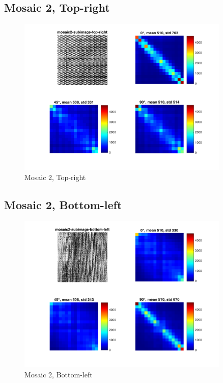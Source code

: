 \documentclass[a4paper,12pt,titlepage]{article}
\begin{document}
\subsection{Mosaic 2, Top-right}
\begin{figure}[H]
\includegraphics[width=0.9\textwidth]{partB-mosaic2-subimage-top-right}
\caption{Mosaic 2, Top-right}
\label{fig:Mosaic2SubimageTopRight}
\end{figure}

\subsection{Mosaic 2, Bottom-left}
\begin{figure}[H]
\includegraphics[width=0.9\textwidth]{partB-mosaic2-subimage-bottom-left}
\caption{Mosaic 2, Bottom-left}
\label{fig:Mosaic2SubimageBottomLeft}
\end{figure}
\end{document}
